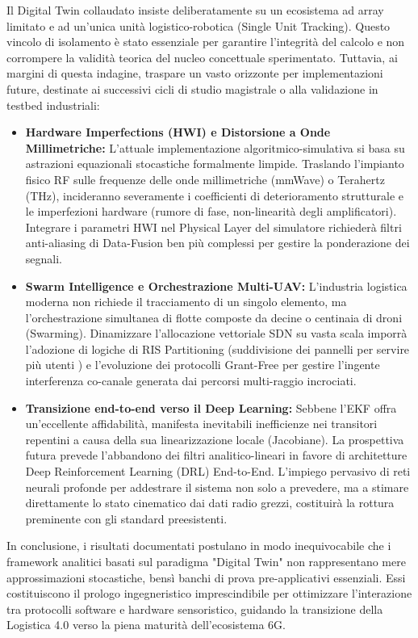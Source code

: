 \documentclass[twoside]{article}
\begin{document}
Il Digital Twin collaudato insiste deliberatamente su un ecosistema ad array limitato e ad un'unica unità logistico-robotica (Single Unit Tracking). Questo vincolo di isolamento è stato essenziale per garantire l'integrità del calcolo e non corrompere la validità teorica del nucleo concettuale sperimentato. Tuttavia, ai margini di questa indagine, traspare un vasto orizzonte per implementazioni future, destinate ai successivi cicli di studio magistrale o alla validazione in testbed industriali:
\begin{itemize}
    \item \textbf{Hardware Imperfections (HWI) e Distorsione a Onde Millimetriche:} L'attuale implementazione algoritmico-simulativa si basa su astrazioni equazionali stocastiche formalmente limpide. Traslando l'impianto fisico RF sulle frequenze delle onde millimetriche (mmWave) o Terahertz (THz), incideranno severamente i coefficienti di deterioramento strutturale e le imperfezioni hardware (rumore di fase, non-linearità degli amplificatori). Integrare i parametri HWI nel Physical Layer del simulatore richiederà filtri anti-aliasing di Data-Fusion ben più complessi per gestire la ponderazione dei segnali.
    \item \textbf{Swarm Intelligence e Orchestrazione Multi-UAV:} L'industria logistica moderna non richiede il tracciamento di un singolo elemento, ma l'orchestrazione simultanea di flotte composte da decine o centinaia di droni (Swarming). Dinamizzare l'allocazione vettoriale SDN su vasta scala imporrà l'adozione di logiche di RIS Partitioning (suddivisione dei pannelli per servire più utenti \cite{Wei2024}) e l'evoluzione dei protocolli Grant-Free \cite{Yu2024} per gestire l'ingente interferenza co-canale generata dai percorsi multi-raggio incrociati.
    \item \textbf{Transizione end-to-end verso il Deep Learning:} Sebbene l'EKF offra un'eccellente affidabilità, manifesta inevitabili inefficienze nei transitori repentini a causa della sua linearizzazione locale (Jacobiane). La prospettiva futura prevede l'abbandono dei filtri analitico-lineari in favore di architetture Deep Reinforcement Learning (DRL) End-to-End. L'impiego pervasivo di reti neurali profonde per addestrare il sistema non solo a prevedere, ma a stimare direttamente lo stato cinematico dai dati radio grezzi, costituirà la rottura preminente con gli standard preesistenti.
\end{itemize}

In conclusione, i risultati documentati postulano in modo inequivocabile che i framework analitici basati sul paradigma "Digital Twin" non rappresentano mere approssimazioni stocastiche, bensì banchi di prova pre-applicativi essenziali. Essi costituiscono il prologo ingegneristico imprescindibile per ottimizzare l'interazione tra protocolli software e hardware sensoristico, guidando la transizione della Logistica 4.0 verso la piena maturità dell'ecosistema 6G.
\end{document}
